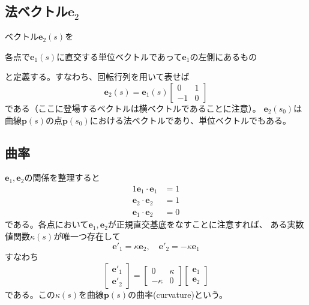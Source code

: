 \documentclass[a4j,disablejfam,dvipdfmx,papersize,slide,uplatex,21pt]{jsarticle}
\begin{document}
\newpage
\subsection*{法ベクトル$\bm{e}_2$}
ベクトル$\bm{e}_2(s)$を
\begin{center}
    各点で$\bm{e}_1(s)$に直交する単位ベクトルであって$\bm{e}_1$の左側にあるもの
\end{center}
と定義する。すなわち、回転行列を用いて表せば
\begin{equation}
    \bm{e}_2(s) = \bm{e}_1(s)
    \left[
    \begin{array}{cc}
        0 & 1 \\
        -1 & 0
    \end{array}
    \right]
\end{equation}
である（ここに登場するベクトルは横ベクトルであることに注意）。
$\bm{e}_2(s_0)$は曲線$\bm{p}(s)$の点$\bm{p}(s_0)$における法ベクトルであり、単位ベクトルでもある。

\newpage
\subsection*{曲率}
$\bm{e}_1, \bm{e}_2$の関係を整理すると
\begin{alignat}{1}
    \bm{e}_1 \cdot \bm{e}_1 &= 1 \\
    \bm{e}_2 \cdot \bm{e}_2 &= 1 \\
    \bm{e}_1 \cdot \bm{e}_2 &= 0
\end{alignat}
である。各点において$\bm{e}_1, \bm{e}_2$が正規直交基底をなすことに注意すれば、
ある実数値関数$\kappa(s)$が唯一つ存在して
\begin{equation}
    \bm{e}'_1 = \kappa \bm{e}_2,\quad
    \bm{e}'_2 = - \kappa \bm{e}_1
\end{equation}
すなわち
\begin{equation}
    \left[
        \begin{array}{c}
            \bm{e}'_1 \\
            \bm{e}'_2
        \end{array}
    \right]
    =
    \left[
        \begin{array}{cc}
            0 & \kappa \\
            -\kappa & 0
        \end{array}
    \right]
    \left[
        \begin{array}{c}
            \bm{e}_1 \\
            \bm{e}_2
        \end{array}
    \right]
\end{equation}
である。この$\kappa(s)$を曲線$\bm{p}(s)$の曲率(curvature)という。
\end{document}
